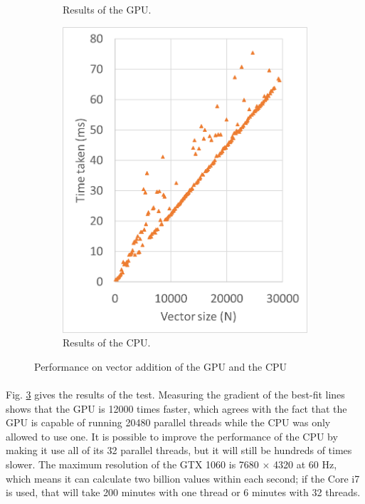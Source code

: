 \documentclass[12pt, twocolumn]{report}
\begin{document}
\begin{figure}[htbp]
\begin{subfigure}{0.45\textwidth}
        \caption{Results of the GPU.}
        \label{Test vector addition GPU}
    \end{subfigure}
    \begin{subfigure}{0.45\textwidth}
        \centering
        \includegraphics[width=1\textwidth]{Figures/Test vector addition CPU.png}
        \caption{Results of the CPU.}
        \label{Test vector addition CPU}
    \end{subfigure}
    \caption{Performance on vector addition of the GPU and the CPU}
    \label{Test vector addition}
\end{figure}

\paragraph{}
Fig. \ref{Test vector addition} gives the results of the test. Measuring the gradient of the best-fit lines shows that the GPU is 12000 times faster, which agrees with the fact that the GPU is capable of running 20480 parallel threads while the CPU was only allowed to use one. It is possible to improve the performance of the CPU by making it use all of its 32 parallel threads, but it will still be hundreds of times slower. The maximum resolution of the GTX 1060 is 7680 $\times$ 4320 at 60 Hz, which means it can calculate two billion values within each second; if the Core i7 is used, that will take 200 minutes with one thread or 6 minutes with 32 threads.
\end{document}
